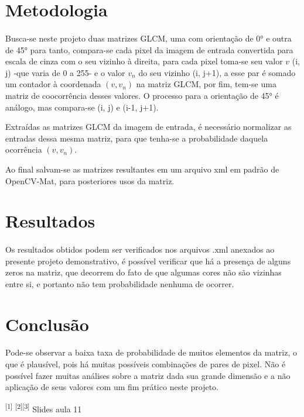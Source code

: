 \documentclass[conference,harvard,brazil,english]{sbatex}
\begin{document}
	\section{Metodologia}
	\paragraph{}
		Busca-se neste projeto duas matrizes GLCM, uma com orientação de 0° e outra de 45° para tanto, compara-se cada pixel da imagem de entrada convertida para escala de cinza com o seu vizinho à direita, para cada pixel toma-se seu valor $v$ (i, j) -que varia de 0 a 255- e o valor $v_n$ do seu vizinho (i, j+1), a esse par é somado um contador à coordenada $(v, v_n)$ na matriz GLCM, por fim, tem-se uma matriz de coocorrência desses valores. O processo para a orientação de 45° é análogo, mas compara-se (i, j) e (i-1, j+1).
		\par Extraídas as matrizes GLCM da imagem de entrada, é necessário normalizar as entradas dessa mesma matriz, para que tenha-se a probabilidade daquela ocorrência $(v, v_n)$. 
		\par Ao final salvam-se as matrizes resultantes em um arquivo xml em padrão de OpenCV-Mat, para posteriores usos da matriz.
		
	\section{Resultados}
	\paragraph{}
		Os resultados obtidos podem ser verificados nos arquivos .xml anexados ao presente projeto demonstrativo, é possível verificar que há a presença de alguns zeros na matriz, que decorrem do fato de que algumas cores não são vizinhas entre si, e portanto não tem probabilidade nenhuma de ocorrer.
	\section{Conclusão}
	\paragraph{}
		Pode-se observar a baixa taxa de probabilidade de muitos elementos da matriz, o que é plausível, pois há muitas possíveis combinações de pares de pixel. Não é possível fazer muitas análises sobre a matriz dada sua grande dimensão e a não aplicação de seus valores com um fim prático neste projeto.
	
	\textsuperscript{[1]}
	\cite{WikiTextura}\newline
	\textsuperscript{[2][3]} Slides aula 11\newline
	\cite{GLCMTutorial}
	
	
	
\end{document}
